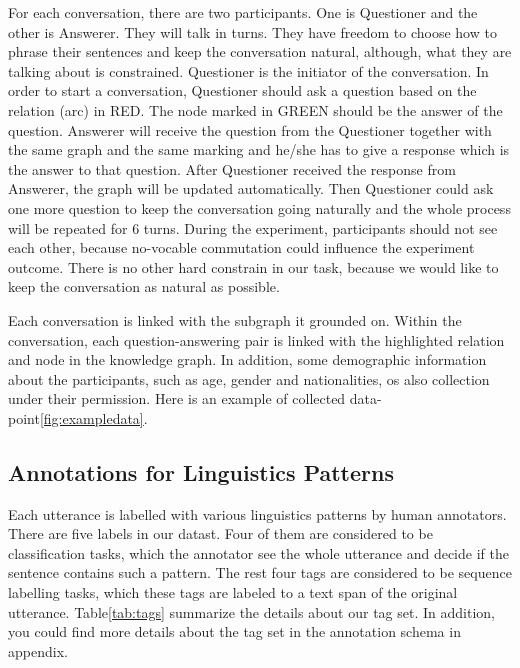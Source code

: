 \documentclass[bsc,frontabs,twoside,singlespacing,parskip,deptreport]{infthesis}     %
\begin{document}
For each conversation, there are two participants. One is Questioner and the other is Answerer. They will talk in turns. They have freedom to choose how to phrase their sentences and keep the conversation natural, although, what they are talking about is constrained. Questioner is the initiator of the conversation. In order to start a conversation, Questioner should ask a question based on the relation (arc) in RED. The node marked in GREEN should be the answer of the question. Answerer will receive the question from the Questioner together with the same graph and the same marking and he/she has to give a response which is the answer to that question. After Questioner received the response from Answerer, the graph will be updated automatically. Then Questioner could ask one more question to keep the conversation going naturally and the whole process will be repeated for 6 turns. During the experiment, participants should not see each other, because no-vocable commutation could influence the experiment outcome. There is no other hard constrain in our task, because we would like to keep the conversation as natural as possible.



Each conversation is linked with the subgraph it grounded on. Within the conversation, each question-answering pair is linked with the highlighted relation and node in the knowledge graph. In addition, some demographic information about the participants, such as age, gender and nationalities, os also collection under their permission. Here is an example of collected data-point\ref{fig:exampledata}.





\subsection{Annotations for Linguistics Patterns}

Each utterance is labelled with various linguistics patterns by human annotators. There are five labels in our datast. Four of them are considered to be classification tasks, which the annotator see the whole utterance and decide if the sentence contains such a pattern. The rest four tags are considered to be sequence labelling tasks, which these tags are labeled to a text span of the original utterance. Table\ref{tab:tags} summarize the details about our tag set. In addition, you could find more details about the tag set in the annotation schema in appendix.
\end{document}

